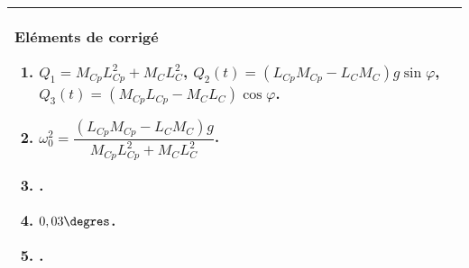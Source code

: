 \begin{multicols}{2}
\ifcolle
\else
\vspace{.5cm}
\begin{tabular}{|p{.95\linewidth}|}
\hline
Eléments de corrigé
\begin{enumerate}
\item $Q_1 = M_{Cp}L_{Cp}^2+M_{C}L_{C}^2 $, $Q_2(t)=\left(   L_{Cp}M_{Cp} - L_CM_C \right)g \sin \varphi$, 
$Q_3(t)= \left(M_{Cp}L_{Cp}- M_CL_C\right)  \cos\varphi$.
\item $\omega_0^2 = \dfrac{\left(   L_{Cp}M_{Cp} - L_CM_C \right)g }{ M_{Cp}L_{Cp}^2+M_{C}L_{C}^2}$.
\item .
\item $0,03 \degres$.
\item .
\end{enumerate}\\
\hline
\end{tabular}
\fi

\ifprof
\else
\end{multicols}
\fi


